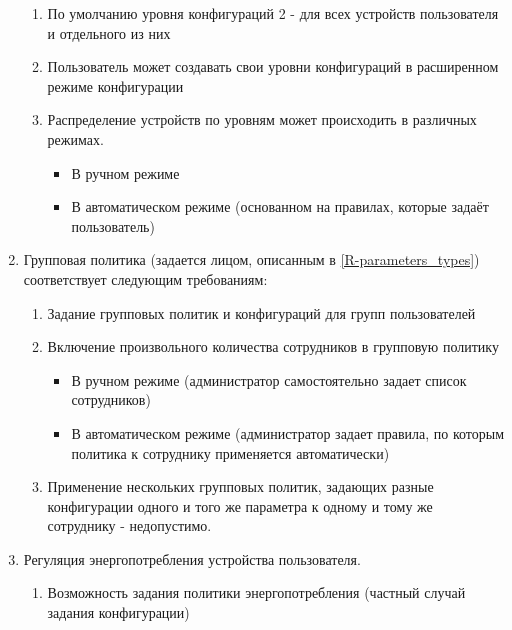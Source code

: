 \begin{enumerate}[label={\bfseries О-\arabic*.}]
\begin{enumerate}[label*={\bfseries\arabic*.}]
            \item По умолчанию уровня конфигураций 2 - для всех устройств пользователя и отдельного из них
            \item Пользователь может создавать свои уровни конфигураций в расширенном режиме конфигурации
            \item Распределение устройств по уровням может происходить в различных режимах.
                  \begin{itemize}
                     \item В ручном режиме
                     \item В автоматическом режиме (основанном на правилах, которые задаёт пользователь)
                  \end{itemize}
         \end{enumerate}
   \item Групповая политика (задается лицом, описанным в \ref{R-parameters_types}) соответствует следующим требованиям:
         \begin{enumerate}[label*={\bfseries\arabic*.}]
            \item Задание групповых политик и конфигураций для групп пользователей
            \item Включение произвольного количества сотрудников в групповую политику
                  \begin{itemize}
                     \item В ручном режиме (администратор самостоятельно задает список сотрудников)
                     \item В автоматическом режиме (администратор задает правила, по которым политика к сотруднику применяется автоматически)
                  \end{itemize}
            \item Применение нескольких групповых политик, задающих разные конфигурации одного и того же параметра к одному и тому же сотруднику - недопустимо.
         \end{enumerate}
   \item Регуляция энергопотребления устройства пользователя.
         \begin{enumerate}[label*={\bfseries\arabic*.}]
            \item Возможность задания политики энергопотребления (частный случай задания конфигурации) %
         \end{enumerate}
\end{enumerate}

